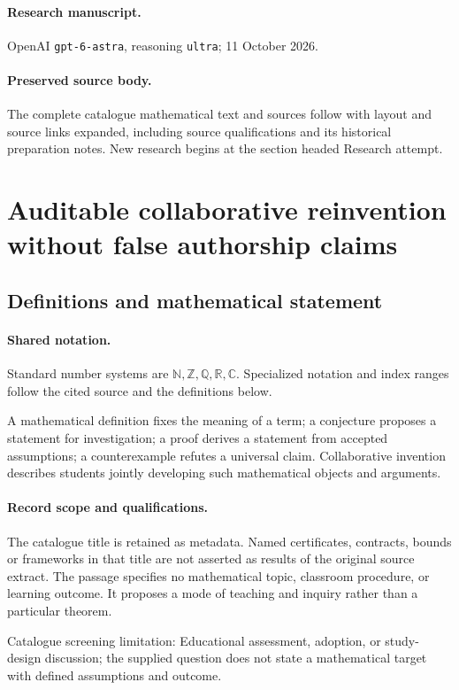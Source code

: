 \documentclass[11pt]{article}
\begin{document}
\paragraph{Research manuscript.} OpenAI \texttt{gpt-6-astra}, reasoning \texttt{ultra}; 11 October 2026.
\paragraph{Preserved source body.} The complete catalogue mathematical text and sources follow with layout and source links expanded, including source qualifications and its historical preparation notes. New research begins at the section headed Research attempt.

\section{Auditable collaborative reinvention without false authorship claims}\label{statement}

\subsection{Definitions and mathematical statement}

\paragraph{Shared notation.}Standard number systems are $\mathbb N,\mathbb Z,\mathbb Q,\mathbb R,\mathbb C$. Specialized notation and index ranges follow the cited source and the definitions below.


A mathematical definition fixes the meaning of a term; a conjecture proposes a statement for investigation; a proof derives a statement from accepted assumptions; a counterexample refutes a universal claim. Collaborative invention describes students jointly developing such mathematical objects and arguments.
\paragraph{Record scope and qualifications.}
The catalogue title is retained as metadata. Named certificates, contracts, bounds or frameworks in that title are not asserted as results of the original source extract.
The passage specifies no mathematical topic, classroom procedure, or learning outcome. It proposes a mode of teaching and inquiry rather than a particular theorem.

Catalogue screening limitation: Educational assessment, adoption, or study-design discussion; the supplied question does not state a mathematical target with defined assumptions and outcome.
\end{document}
